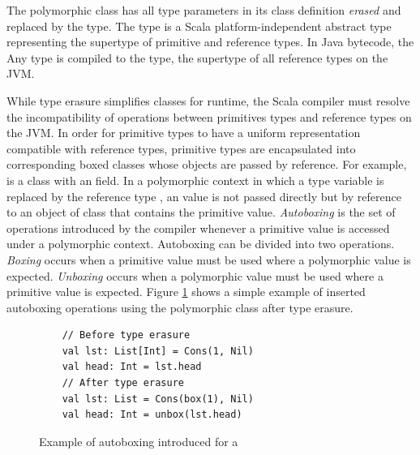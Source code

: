 The polymorphic  class has all type parameters in its class definition \textit{erased} and replaced by the  type.
The  type is a Scala platform-independent\cite{scala:overview} abstract type representing the supertype of primitive and reference types.
In Java bytecode, the {Any} type is compiled to the  type, the supertype of all reference types on the JVM.

While type erasure simplifies classes for runtime, the Scala compiler must resolve the incompatibility of operations between primitives types and reference types on the JVM\cite{java:vm-spec}.
In order for primitive types to have a uniform representation compatible with reference types, primitive types are encapsulated into corresponding boxed classes whose objects are passed by reference.
For example,  is a class with an  field.
In a polymorphic context in which a type variable is replaced by the reference type , an  value is not passed directly but by reference to an object of class  that contains the primitive value.
\textit{Autoboxing}\cite{java:autoboxing} is the set of operations introduced by the compiler whenever a primitive value is accessed under a polymorphic context. 
Autoboxing can be divided into two operations.
\textit{Boxing} occurs when a primitive value must be used where a polymorphic value is expected.
\textit{Unboxing} occurs when a polymorphic value must be used where a primitive value is expected.
Figure \ref{example:autoboxing} shows a simple example of inserted autoboxing operations using the polymorphic  class after type erasure.

\begin{figure}[!htb]
	\begin{verbatim}
	// Before type erasure 	
	val lst: List[Int] = Cons(1, Nil)
	val head: Int = lst.head
	// After type erasure
	val lst: List = Cons(box(1), Nil)
	val head: Int = unbox(lst.head) 
	\end{verbatim}
	\caption{Example of autoboxing introduced for a }
	\label{example:autoboxing}
\end{figure}

